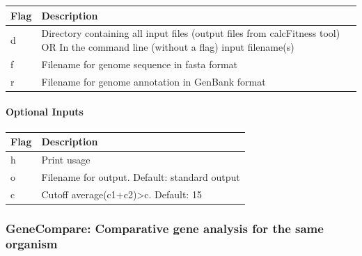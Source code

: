 \documentclass[11pt,]{article}
\let\oldparagraph\paragraph
\renewcommand{\paragraph}[1]{\oldparagraph{#1}\mbox{}}
\begin{document}
\begin{longtable}[]{@{}ll@{}}
\toprule
\begin{minipage}[b]{0.05\columnwidth}\raggedright\strut
Flag\strut
\end{minipage} & \begin{minipage}[b]{0.89\columnwidth}\raggedright\strut
Description\strut
\end{minipage}\tabularnewline
\midrule
\endhead
\begin{minipage}[t]{0.05\columnwidth}\raggedright\strut
d\strut
\end{minipage} & \begin{minipage}[t]{0.89\columnwidth}\raggedright\strut
Directory containing all input files (output files from calcFitness
tool) OR In the command line (without a flag) input filename(s)\strut
\end{minipage}\tabularnewline
\begin{minipage}[t]{0.05\columnwidth}\raggedright\strut
f\strut
\end{minipage} & \begin{minipage}[t]{0.89\columnwidth}\raggedright\strut
Filename for genome sequence in fasta format\strut
\end{minipage}\tabularnewline
\begin{minipage}[t]{0.05\columnwidth}\raggedright\strut
r\strut
\end{minipage} & \begin{minipage}[t]{0.89\columnwidth}\raggedright\strut
Filename for genome annotation in GenBank format\strut
\end{minipage}\tabularnewline
\bottomrule
\end{longtable}

\paragraph{Optional Inputs}\label{optional-inputs-2}

\begin{longtable}[]{@{}ll@{}}
\toprule
Flag & Description\tabularnewline
\midrule
\endhead
h & Print usage\tabularnewline
o & Filename for output. Default: standard output\tabularnewline
c & Cutoff average(c1+c2)\textgreater{}c. Default: 15\tabularnewline
\bottomrule
\end{longtable}

\subsubsection{GeneCompare: Comparative gene analysis for the same
organism}\label{genecompare-comparative-gene-analysis-for-the-same-organism}
\end{document}
